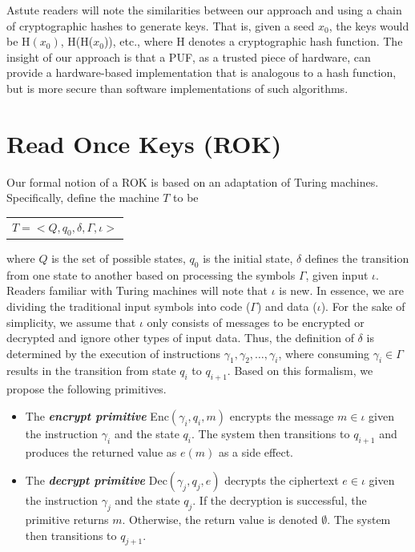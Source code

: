 Astute readers will note the similarities between our approach and using a chain of cryptographic hashes to generate
keys.  That is, given a seed $x_0$, the keys would be {\sf H}$(x_0)$, {\sf H}({\sf H}($x_0$)), etc., where {\sf H}
denotes a cryptographic hash function.  The insight of our approach is that a PUF, as a trusted piece of hardware,
can provide a hardware-based implementation that is analogous to a hash function, but is more secure than
software implementations of such algorithms.

\section{Read Once Keys (ROK)}
Our formal notion of a ROK is based on an adaptation of Turing machines.  Specifically, define the machine $T$ to be
\begin{center}
\begin{tabular}{c}
$T = < Q,q_0,\delta,\Gamma,\iota >$
\end{tabular}
\end{center}
where $Q$ is the set of possible states, $q_0$ is the initial state, $\delta$ defines the transition
from one state to another based on processing the symbols $\Gamma$, given input $\iota$.  Readers familiar with Turing
machines will note that $\iota$ is new.  In essence, we are dividing the traditional input symbols into code ($\Gamma$)
and data ($\iota$).  For the sake of simplicity, we assume that $\iota$ only consists of messages to be encrypted or
decrypted and ignore other types of input data.  Thus, the definition of $\delta$ is determined by the execution of
instructions $\gamma_1, \gamma_2, \ldots, \gamma_i$, where consuming $\gamma_i \in \Gamma$ results in the transition from state $q_i$ to
$q_{i+1}$.  Based on this formalism, we propose the following primitives.

\begin{itemize}
\item The \emph{\bf encrypt primitive} {\sf Enc}$(\gamma_i,q_i,m)$ encrypts the message $m \in \iota$ given the instruction
$\gamma_i$ and the state $q_i$.  The system then transitions to $q_{i+1}$ and produces the returned value as $e(m)$ as a side effect.
\item The \emph{\bf decrypt primitive} {\sf Dec}$(\gamma_j,q_j,e)$ decrypts the ciphertext $e \in \iota$ given the instruction
$\gamma_j$ and the state $q_j$.  If the decryption is successful, the primitive returns $m$.  Otherwise, the return value is 
denoted $\emptyset$.  The system then transitions to $q_{j+1}$.
\end{itemize}

